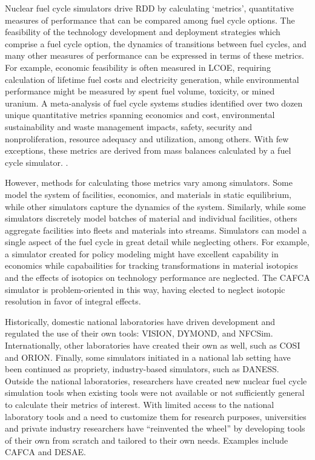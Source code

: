 Nuclear fuel cycle simulators drive \gls{RDD} by calculating `metrics',
quantitative measures of performance that can be compared among fuel cycle
options. The feasibility of the technology development and deployment
strategies which comprise a fuel cycle option, the dynamics of transitions
between fuel cycles, and many other measures of performance can be expressed in
terms of these metrics. For example, economic feasibility is often measured in
\gls{LCOE}, requiring calculation of lifetime
fuel costs and electricity generation, while environmental performance might be
measured by spent fuel volume, toxicity, or mined uranium.  A meta-analysis of
fuel cycle systems studies identified over two dozen unique quantitative
metrics spanning economics and cost, environmental sustainability and waste
management impacts, safety, security and nonproliferation, resource adequacy
and utilization, among others. With few exceptions, these metrics are derived
from mass balances calculated by a fuel cycle simulator.
\cite{flicker_evaluation_2014}.

However, methods for calculating those metrics vary among simulators. Some
model the system of facilities, economics, and materials in static equilibrium,
while other simulators capture the dynamics of the system.  Similarly, while
some simulators discretely model batches of material and individual facilities,
others aggregate facilities into fleets and materials into streams. Simulators
can model a single aspect of the fuel cycle in great detail while neglecting
others. For example, a simulator created for policy modeling might have
excellent capability in economics while capabailities for tracking transformations in
material isotopics and the effects of isotopics on technology performance are
neglected.  The \gls{CAFCA}\cite{guerin_impact_2009} simulator is problem-oriented
in this way, having elected to neglect isotopic resolution in favor of
integral effects.

Historically, domestic national laboratories have driven development and
regulated the use of their own tools:
\gls{VISION}\cite{jacobson_verifiable_2010},
\gls{DYMOND}\cite{yacout_modeling_2005}, and
\gls{NFCSim}\cite{schneider_nfcsim:_2005,allan_guidance_2008}.  Internationally,
other laboratories have created their own as well, such as
\gls{COSI}\cite{boucher_cosi_2005,boucher_cosi:_2006,meyer_new_2009,coquelet-pascal_comparison_2011}
and ORION\cite{worrall_scenario_2007}.  Finally, some simulators initiated in a national lab setting have
been continued as propriety, industry-based simulators, such as
\gls{DANESS}\cite{van_den_durpel_daness_2009}.  Outside the national laboratories,
researchers have created new nuclear fuel cycle simulation tools when existing
tools were not available or not sufficiently general to calculate their metrics
of interest.  With limited access to the
national laboratory tools and a need to customize them for research purposes,
universities and private industry researchers have ``reinvented the wheel'' by
developing tools of their own from scratch and tailored to their own needs.
Examples include \gls{CAFCA}\cite{guerin_benchmark_2009} and
\gls{DESAE}\cite{andrianova_desae_2008,mccarthy_benchmark_2012,allan_guidance_2008}.


